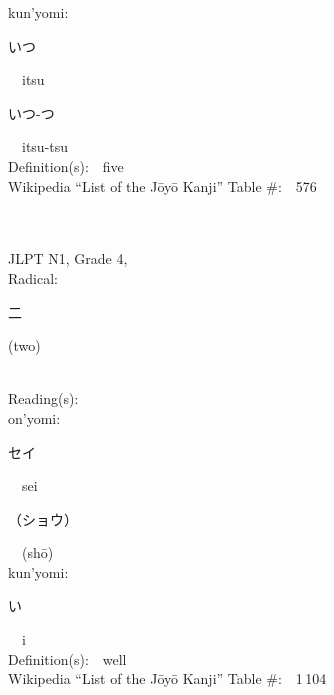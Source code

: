 \begin{multicols}{2}
{\hspace*{1em}}kun'yomi:\ \ \\
{\hspace*{2em}}{\begin{CJK}{UTF8}{min} いつ \end{CJK}}\ \ itsu\ \ \\
{\hspace*{2em}}{\begin{CJK}{UTF8}{min} いつ-つ \end{CJK}}\ \ itsu-tsu\ \ \\
Definition(s):\ \ five \\
Wikipedia ``List of the J\=oy\=o Kanji'' Table \#:\ \ 576 \\
\ \ \\
{\fontsize{34pt}{40pt}  }\ \ \\  %
{JLPT N1, Grade 4, \\Radical:\ \ {\begin{CJK}{UTF8}{min} 二 \end{CJK}} (two) } \\
Reading(s):\ \ \\
{\hspace*{1em}}on'yomi:\ \ \\
{\hspace*{2em}}{\begin{CJK}{UTF8}{min} セイ \end{CJK}}\ \ sei\ \ \\
{\hspace*{2em}}{\begin{CJK}{UTF8}{min} （ショウ） \end{CJK}}\ \ (sh\=o)\ \ \\
{\hspace*{1em}}kun'yomi:\ \ \\
{\hspace*{2em}}{\begin{CJK}{UTF8}{min} い \end{CJK}}\ \ i\ \ \\
Definition(s):\ \ well \\
Wikipedia ``List of the J\=oy\=o Kanji'' Table \#:\ \ 1\,104 \\
\ \ \\
{\fontsize{34pt}{40pt}  }\ \ \\  %

\end{multicols}
